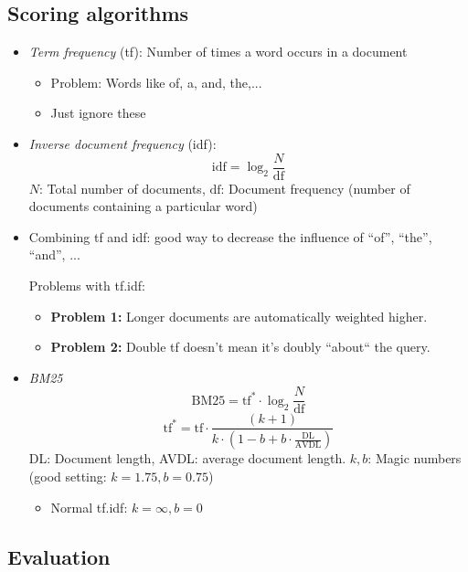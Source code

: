 \documentclass[a4paper]{scrartcl}
\begin{document}
\subsection{Scoring algorithms}
\label{sec:scoring_algorithms}
\begin{itemize}
\item \emph{Term frequency} (tf): Number of times a word occurs in a document
  \begin{itemize}
  \item Problem: Words like of, a, and, the,...
  \item Just ignore these
  \end{itemize}
\item \emph{Inverse document frequency} (idf):
  \begin{equation}
    \mathrm{idf}=\log_2\frac{N}{\mathrm{df}}
  \end{equation}
  $N$: Total number of documents, $\mathrm{df}$: Document frequency (number of
  documents containing a particular word)
\item Combining tf and idf: good way to decrease the influence of “of”, “the”,
  “and”, ...

  Problems with tf.idf:
  \begin{itemize}
  \item \textbf{Problem 1:} Longer documents are automatically weighted higher.
  \item \textbf{Problem 2:} Double tf doesn't mean it's doubly “about“ the query.
  \end{itemize}
\item \emph{BM25}
  \begin{equation}
    \mathrm{BM25}=\mathrm{tf}^*\cdot \log_2\frac{N}{\mathrm{df}}
  \end{equation}
  \begin{equation}
    \mathrm{tf}^*=\mathrm{tf}\cdot \frac{(k+1)}{k\cdot(1-b + b \cdot \frac{\mathrm{DL}}{\mathrm{AVDL}})}
  \end{equation}
  DL: Document length, AVDL: average document length. $k,b$: Magic numbers (good
  setting: $k=1.75, b=0.75$)
  \begin{itemize}
  \item Normal tf.idf: $k=\infty, b=0$
  \end{itemize}
\end{itemize}

\subsection{Evaluation}
\end{document}
